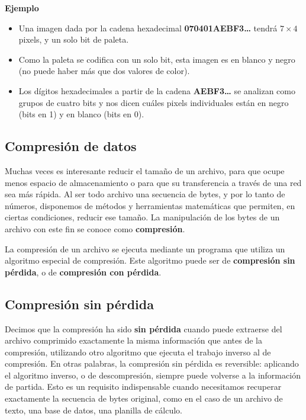 \documentclass[spanish,A4,]{article}
\begin{document}
\textbf{Ejemplo}

\begin{itemize}
\itemsep1pt\parskip0pt
\item
  Una imagen dada por la cadena hexadecimal \textbf{070401AEBF3\ldots{}}
  tendrá $7 \times 4$ pixels, y un solo bit de paleta.
\item
  Como la paleta se codifica con un solo bit, esta imagen es en blanco y
  negro (no puede haber más que dos valores de color).
\item
  Los dígitos hexadecimales a partir de la cadena \textbf{AEBF3\ldots{}}
  se analizan como grupos de cuatro bits y nos dicen cuáles pixels
  individuales están en negro (bits en 1) y en blanco (bits en 0).
\end{itemize}

\subsection{Compresión de datos}\label{compresiuxf3n-de-datos}

Muchas veces es interesante reducir el tamaño de un archivo, para que
ocupe menos espacio de almacenamiento o para que su transferencia a
través de una red sea más rápida. Al ser todo archivo una secuencia de
bytes, y por lo tanto de números, disponemos de métodos y herramientas
matemáticas que permiten, en ciertas condiciones, reducir ese tamaño. La
manipulación de los bytes de un archivo con este fin se conoce como
\textbf{compresión}.

La compresión de un archivo se ejecuta mediante un programa que utiliza
un algoritmo especial de compresión. Este algoritmo puede ser de
\textbf{compresión sin pérdida}, o de \textbf{compresión con pérdida}.

\subsection{Compresión sin pérdida}\label{compresiuxf3n-sin-puxe9rdida}

Decimos que la compresión ha sido \textbf{sin pérdida} cuando puede
extraerse del archivo comprimido exactamente la misma información que
antes de la compresión, utilizando otro algoritmo que ejecuta el trabajo
inverso al de compresión. En otras palabras, la compresión sin pérdida
es reversible: aplicando el algoritmo inverso, o de descompresión,
siempre puede volverse a la información de partida. Esto es un requisito
indispensable cuando necesitamos recuperar exactamente la secuencia de
bytes original, como en el caso de un archivo de texto, una base de
datos, una planilla de cálculo.
\end{document}
